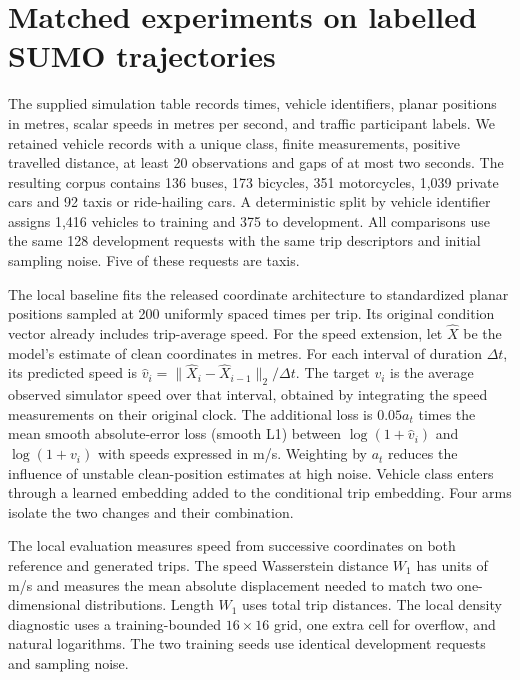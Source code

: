\documentclass[11pt,a4paper]{article}
\begin{document}
\section{Matched experiments on labelled SUMO trajectories}
The supplied simulation table records times, vehicle identifiers, planar positions in metres, scalar speeds in metres per second, and traffic participant labels. We retained vehicle records with a unique class, finite measurements, positive travelled distance, at least 20 observations and gaps of at most two seconds. The resulting corpus contains 136 buses, 173 bicycles, 351 motorcycles, 1,039 private cars and 92 taxis or ride-hailing cars. A deterministic split by vehicle identifier assigns 1,416 vehicles to training and 375 to development. All comparisons use the same 128 development requests with the same trip descriptors and initial sampling noise. Five of these requests are taxis.

The local baseline fits the released coordinate architecture to standardized planar positions sampled at 200 uniformly spaced times per trip. Its original condition vector already includes trip-average speed. For the speed extension, let $\hat X$ be the model's estimate of clean coordinates in metres. For each interval of duration $\Delta t$, its predicted speed is $\hat v_i=\|\hat X_i-\hat X_{i-1}\|_2/\Delta t$. The target $v_i$ is the average observed simulator speed over that interval, obtained by integrating the speed measurements on their original clock. The additional loss is $0.05a_t$ times the mean smooth absolute-error loss (smooth L1) between $\log(1+\hat v_i)$ and $\log(1+v_i)$ with speeds expressed in m/s. Weighting by $a_t$ reduces the influence of unstable clean-position estimates at high noise. Vehicle class enters through a learned embedding added to the conditional trip embedding. Four arms isolate the two changes and their combination.

The local evaluation measures speed from successive coordinates on both reference and generated trips. The speed Wasserstein distance $W_1$ has units of m/s and measures the mean absolute displacement needed to match two one-dimensional distributions. Length $W_1$ uses total trip distances. The local density diagnostic uses a training-bounded $16\times16$ grid, one extra cell for overflow, and natural logarithms. The two training seeds use identical development requests and sampling noise.
\end{document}
